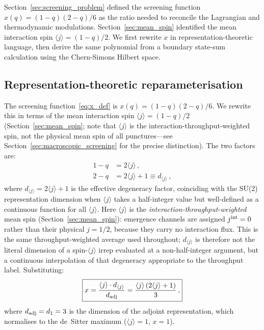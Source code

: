 \documentclass[aps,prd,twocolumn,10pt,superscriptaddress,nofootinbib]{revtex4-2}
\begin{document}
Section~\ref{sec:screening_problem} defined the screening function
$x(q) = (1-q)(2-q)/6$ as the ratio needed to reconcile the
Lagrangian and thermodynamic modulations.
Section~\ref{sec:mean_spin} identified the mean interaction spin
$\langle j \rangle = (1-q)/2$.  We first rewrite $x$ in
representation-theoretic language, then derive the same polynomial
from a boundary state-sum calculation using the Chern-Simons
Hilbert space.


\subsection{Representation-theoretic reparameterisation}
\label{sec:algebraic}

The screening function~\eqref{eq:x_def} is
$x(q) = (1-q)(2-q)/6$.  We rewrite this in terms of the mean
interaction spin $\langle j \rangle = (1-q)/2$
(Section~\ref{sec:mean_spin}; note that $\langle j \rangle$ is
the interaction-throughput-weighted spin, not the physical mean
spin of all punctures---see
Section~\ref{sec:macroscopic_screening} for the precise
distinction).  The two factors
are:
\begin{align}
1-q &= 2\langle j\rangle\,,
\label{eq:factor1} \\
2-q &= 2\langle j\rangle + 1 \equiv d_{\langle j\rangle}\,,
\label{eq:factor2}
\end{align}
where $d_{\langle j\rangle} = 2\langle j\rangle+1$ is the
effective degeneracy factor, coinciding with the SU(2)
representation dimension when $\langle j \rangle$ takes a
half-integer value but well-defined as a continuous function for
all $\langle j \rangle$.  Here $\langle j \rangle$ is the
\emph{interaction-throughput-weighted} mean spin (Section~\ref{sec:mean_spin}):
emergence channels are assigned $j^{\rm int} = 0$ rather than
their physical $j = 1/2$, because they carry no interaction flux.
This is the same throughput-weighted average used throughout;
$d_{\langle j\rangle}$ is therefore not the literal dimension of
a spin-$\langle j\rangle$ irrep evaluated at a non-half-integer
argument, but a continuous interpolation of that degeneracy
appropriate to the throughput label.  Substituting:
\begin{equation}
\boxed{x = \frac{\langle j\rangle \cdot d_{\langle j\rangle}}
  {d_{\rm adj}}
  = \frac{\langle j\rangle\,(2\langle j\rangle + 1)}{3}\,,}
\label{eq:x_spin}
\end{equation}
where $d_{\rm adj} = d_1 = 3$ is the dimension of the adjoint
representation, which normalises to the de~Sitter maximum
($\langle j \rangle = 1$, $x = 1$).
\end{document}

